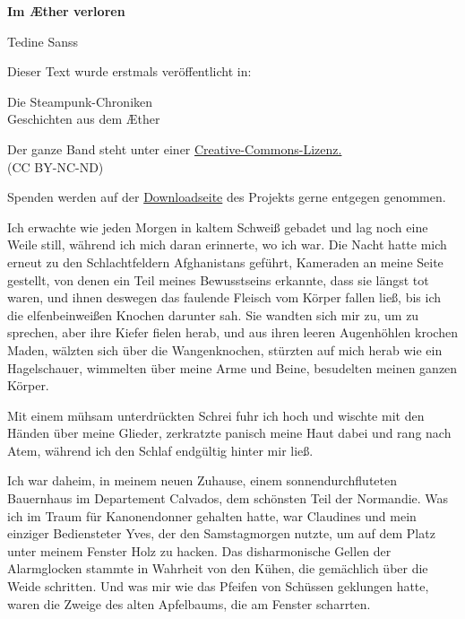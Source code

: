 \usepackage[ngerman]{babel}
\usepackage[T1]{fontenc}



\newcommand\bigpar\medskip


\raggedbottom
\begin{center}
\textbf{\huge\textsf{Im Æther verloren}}

\medskip
Tedine Sanss

\end{center}

\bigskip

\begin{flushleft}
Dieser Text wurde erstmals veröffentlicht in:
\begin{center}
Die Steampunk-Chroniken\\
Geschichten aus dem Æther
\end{center}

\bigskip

Der ganze Band steht unter einer 
\href{http://creativecommons.org/licenses/by-nc-nd/2.0/de/}{Creative-Commons-Lizenz.} \\ 
(CC BY-NC-ND)

\bigskip

Spenden werden auf der 
\href{http://steampunk-chroniken.de/download}{Downloadseite}
des Projekts gerne entgegen genommen. 
\end{flushleft}

\newpage

Ich erwachte wie jeden Morgen in kaltem Schweiß gebadet und lag
noch eine Weile still, während ich mich daran erinnerte, wo ich
war. Die Nacht hatte mich erneut zu den Schlachtfeldern
Afghanistans geführt, Kameraden an meine Seite gestellt, von denen
ein Teil meines Bewusstseins erkannte, dass sie längst tot waren,
und ihnen deswegen das faulende Fleisch vom Körper fallen ließ, bis
ich die elfenbeinweißen Knochen darunter sah. Sie wandten sich mir
zu, um zu sprechen, aber ihre Kiefer fielen herab, und aus ihren
leeren Augenhöhlen krochen Maden, wälzten sich über die
Wangenknochen, stürzten auf mich herab wie ein Hagelschauer,
wimmelten über meine Arme und Beine, besudelten meinen ganzen
Körper.

\bigpar

Mit einem mühsam unterdrückten Schrei fuhr ich hoch und wischte mit
den Händen über meine Glieder, zerkratzte panisch meine Haut dabei
und rang nach Atem, während ich den Schlaf endgültig hinter mir
ließ.

Ich war daheim, in meinem neuen Zuhause, einem sonnendurchfluteten
Bauernhaus im Departement Calvados, dem schönsten Teil der
Normandie. Was ich im Traum für Kanonendonner gehalten hatte, war
Claudines und mein einziger Bediensteter Yves, der den
Samstagmorgen nutzte, um auf dem Platz unter meinem Fenster Holz zu
hacken. Das disharmonische Gellen der Alarmglocken stammte in
Wahrheit von den Kühen, die gemächlich über die Weide schritten.
Und was mir wie das Pfeifen von Schüssen geklungen hatte, waren die
Zweige des alten Apfelbaums, die am Fenster scharrten.

